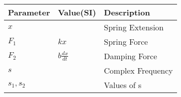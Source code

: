 \begin{tabular}{|l|l|l|}
\hline
\textbf{Parameter} & \textbf{Value(SI)} & \textbf{Description} \\ \hline
$x$          &  & Spring Extension \\ \hline
$F_1$ & $kx$ & Spring Force \\ \hline
$F_2$ & $b\frac{dx}{dt}$ & Damping Force \\ \hline
$s$ & & Complex Frequency \\ \hline
$s_1, s_2$          &  & Values of s \\ \hline
\end{tabular}
